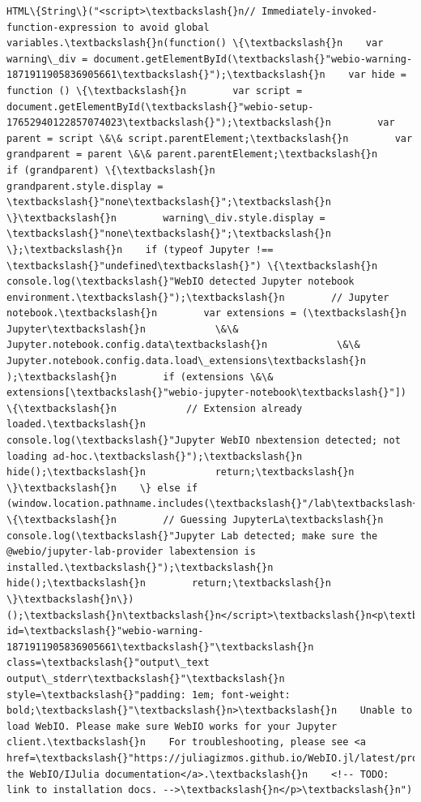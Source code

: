 \documentclass[11pt]{article}
\begin{document}
    
    \begin{Verbatim}[commandchars=\\\{\}]
HTML\{String\}("<script>\textbackslash{}n// Immediately-invoked-function-expression to avoid global variables.\textbackslash{}n(function() \{\textbackslash{}n    var warning\_div = document.getElementById(\textbackslash{}"webio-warning-1871911905836905661\textbackslash{}");\textbackslash{}n    var hide = function () \{\textbackslash{}n        var script = document.getElementById(\textbackslash{}"webio-setup-17652940122857074023\textbackslash{}");\textbackslash{}n        var parent = script \&\& script.parentElement;\textbackslash{}n        var grandparent = parent \&\& parent.parentElement;\textbackslash{}n        if (grandparent) \{\textbackslash{}n            grandparent.style.display = \textbackslash{}"none\textbackslash{}";\textbackslash{}n        \}\textbackslash{}n        warning\_div.style.display = \textbackslash{}"none\textbackslash{}";\textbackslash{}n    \};\textbackslash{}n    if (typeof Jupyter !== \textbackslash{}"undefined\textbackslash{}") \{\textbackslash{}n        console.log(\textbackslash{}"WebIO detected Jupyter notebook environment.\textbackslash{}");\textbackslash{}n        // Jupyter notebook.\textbackslash{}n        var extensions = (\textbackslash{}n            Jupyter\textbackslash{}n            \&\& Jupyter.notebook.config.data\textbackslash{}n            \&\& Jupyter.notebook.config.data.load\_extensions\textbackslash{}n        );\textbackslash{}n        if (extensions \&\& extensions[\textbackslash{}"webio-jupyter-notebook\textbackslash{}"]) \{\textbackslash{}n            // Extension already loaded.\textbackslash{}n            console.log(\textbackslash{}"Jupyter WebIO nbextension detected; not loading ad-hoc.\textbackslash{}");\textbackslash{}n            hide();\textbackslash{}n            return;\textbackslash{}n        \}\textbackslash{}n    \} else if (window.location.pathname.includes(\textbackslash{}"/lab\textbackslash{}")) \{\textbackslash{}n        // Guessing JupyterLa\textbackslash{}n        console.log(\textbackslash{}"Jupyter Lab detected; make sure the @webio/jupyter-lab-provider labextension is installed.\textbackslash{}");\textbackslash{}n        hide();\textbackslash{}n        return;\textbackslash{}n    \}\textbackslash{}n\})();\textbackslash{}n\textbackslash{}n</script>\textbackslash{}n<p\textbackslash{}n    id=\textbackslash{}"webio-warning-1871911905836905661\textbackslash{}"\textbackslash{}n    class=\textbackslash{}"output\_text output\_stderr\textbackslash{}"\textbackslash{}n    style=\textbackslash{}"padding: 1em; font-weight: bold;\textbackslash{}"\textbackslash{}n>\textbackslash{}n    Unable to load WebIO. Please make sure WebIO works for your Jupyter client.\textbackslash{}n    For troubleshooting, please see <a href=\textbackslash{}"https://juliagizmos.github.io/WebIO.jl/latest/providers/ijulia/\textbackslash{}">\textbackslash{}n    the WebIO/IJulia documentation</a>.\textbackslash{}n    <!-- TODO: link to installation docs. -->\textbackslash{}n</p>\textbackslash{}n")
    \end{Verbatim}
\end{document}
